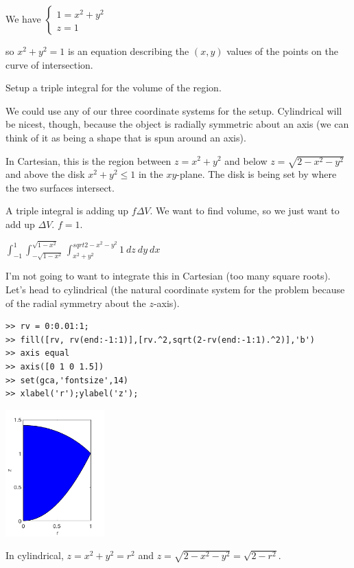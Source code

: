 \documentclass[12pt,letterpaper,noanswers]{exam}
\begin{document}
\begin{questions}
\begin{parts}
\begin{solution}
We have
$\left\{\begin{array}{c} 1 = x^2+y^2 \\ z = 1\end{array}\right.$

so $x^2+y^2=1$ is an equation describing the $(x,y)$ values of the points on the curve of intersection.
\end{solution}
\item Setup a triple integral for the volume of the region.
\begin{solution}
We could use any of our three coordinate systems for the setup.  Cylindrical will be nicest, though, because the object is radially symmetric about an axis (we can think of it as being a shape that is spun around an axis).

In Cartesian, this is the region between $z = x^2+y^2$ and below $z = \sqrt{2-x^2-y^2}$ and above the disk $x^2+y^2\leq 1$ in the $xy$-plane.  The disk is being set by where the two surfaces intersect.

A triple integral is adding up $f\Delta V$.  We want to find volume, so we just want to add up $\Delta V$.  $f = 1$.

$\displaystyle \int_{-1}^1\int_{-\sqrt{1-x^2}}^{\sqrt{1-x^2}}\int_{x^2+y^2}^{sqrt{2-x^2-y^2}}1\  dz\ dy\ dx$

I'm not going to want to integrate this in Cartesian (too many square roots). Let's head to cylindrical (the natural coordinate system for the problem because of the radial symmetry about the $z$-axis).

\begin{verbatim}
>> rv = 0:0.01:1;
>> fill([rv, rv(end:-1:1)],[rv.^2,sqrt(2-rv(end:-1:1).^2)],'b')
>> axis equal
>> axis([0 1 0 1.5])
>> set(gca,'fontsize',14)
>> xlabel('r');ylabel('z');
\end{verbatim}

\includegraphics[width=1.5in]{img/pset07-p2-18.png}

In cylindrical, $z = x^2+y^2 = r^2$ and $z = \sqrt{2-x^2-y^2} = \sqrt{2-r^2}$.


\end{solution}
\end{parts}
\end{questions}
\end{document}
